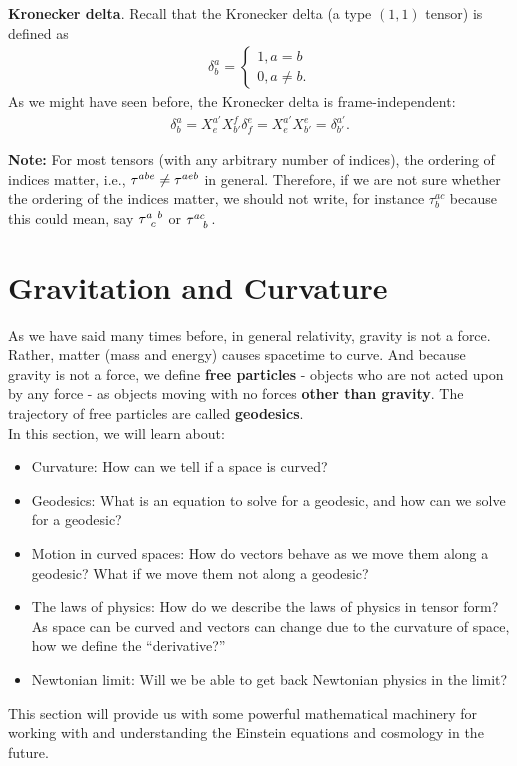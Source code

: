\documentclass{article}
\theoremstyle{definition}
\begin{document}
\noindent \textbf{Kronecker delta}. Recall that the Kronecker delta (a type $(1,1)$ tensor) is defined as
\begin{align*}
\delta^a_b = \begin{cases*}
1, a=b\\
0, a\neq b.
\end{cases*}
\end{align*}
As we might have seen before, the Kronecker delta is frame-independent:
\begin{align*}
\delta^{a}_b =X^{a'}_{e}X^{f}_{b'}\delta^{e}_f = X^{a'}_eX^e_{b'} =\delta^{a'}_{b'}.
\end{align*}

\noindent \textbf{Note:} For most tensors (with any arbitrary number of indices), the ordering of indices matter, i.e., $\tensor{\tau}{^{abe}} \neq \tensor{\tau}{^{aeb}}$ in general. Therefore, if we are not sure whether the ordering of the indices matter, we should not write, for instance $\tau^{ac}_b$ because this could mean, say $\tensor{\tau}{^a_c^b}$ or $\tensor{\tau}{^{ac}_b}$. 
	 

\newpage

\section{Gravitation and Curvature}
As we have said many times before, in general relativity, gravity is not a force. Rather, matter (mass and energy) causes spacetime to curve. And because gravity is not a force, we define \textbf{free particles} - objects who are not acted upon by any force - as objects moving with no forces \textbf{other than gravity}. The trajectory of free particles are called \textbf{geodesics}. \\

In this section, we will learn about:
\begin{itemize}
	\item Curvature: How can we tell if a space is curved?
	\item Geodesics: What is an equation to solve for a geodesic, and how can we solve for a geodesic?
	\item Motion in curved spaces: How do vectors behave as we move them along a geodesic? What if we move them not along a geodesic?
	\item The laws of physics: How do we describe the laws of physics in tensor form? As space can be curved and vectors can change due to the curvature of space, how we define the ``derivative?''
	\item Newtonian limit: Will we be able to get back Newtonian physics in the limit?
\end{itemize}
This section will provide us with some powerful mathematical machinery for working with and understanding the Einstein equations and cosmology in the future.
\end{document}

